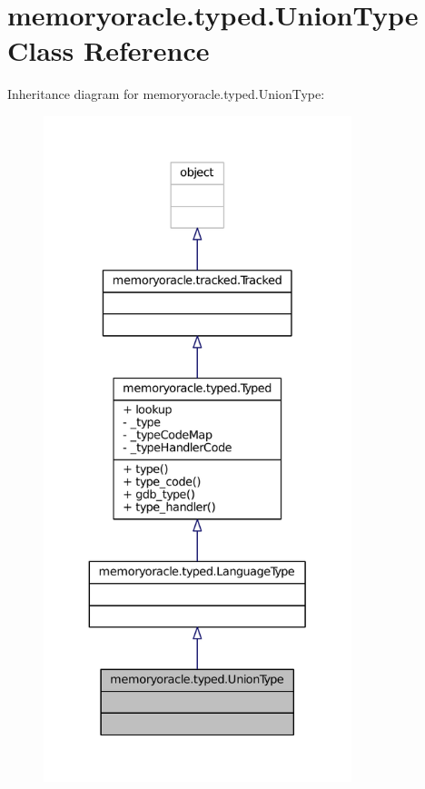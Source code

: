 \hypertarget{classmemoryoracle_1_1typed_1_1UnionType}{}\section{memoryoracle.\+typed.\+Union\+Type Class Reference}
\label{classmemoryoracle_1_1typed_1_1UnionType}


Inheritance diagram for memoryoracle.\+typed.\+Union\+Type\+:\nopagebreak
\begin{figure}[H]
\begin{center}
\leavevmode
\includegraphics[height=550pt]{classmemoryoracle_1_1typed_1_1UnionType__inherit__graph}
\end{center}
\end{figure}


